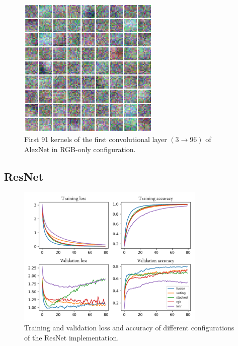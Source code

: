 \documentclass{l4proj}
\begin{document}
\begin{figure}[ht]
  \centering
  \includegraphics[width=0.6\textwidth]{images/evaluation/kernels/alexnet_color.png}
  \caption{First 91 kernels of the first convolutional layer $(3 \rightarrow 96)$ of AlexNet in RGB-only configuration.}
  \label{fig:kernels_alexnet}
\end{figure}

\subsection{ResNet}

\begin{figure}[ht]
  \centering
  \includegraphics[width=0.8\textwidth]{images/evaluation/gridsearch/resnet.png}
  \caption{Training and validation loss and accuracy of different configurations of the ResNet implementation.}
  \label{fig:resnet_configs}
\end{figure}

\end{document}
